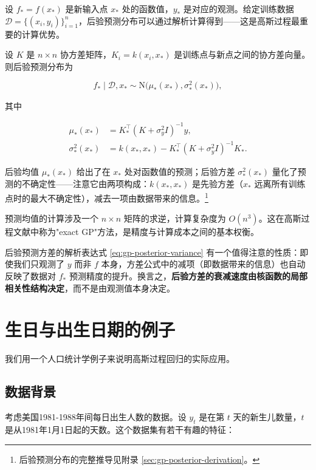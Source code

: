 设 $f_* = f(x_*)$ 是新输入点 $x_*$ 处的函数值，$y_*$ 是对应的观测。给定训练数据 $\mathcal{D} = \{(x_i, y_i)\}_{i=1}^n$，后验预测分布可以通过解析计算得到——这是高斯过程最重要的计算优势。

设 $K$ 是 $n \times n$ 协方差矩阵，$K_i = k(x_i, x_*)$ 是训练点与新点之间的协方差向量。则后验预测分布为

\begin{equation}
f_* \mid \mathcal{D}, x_* \sim \mathrm{N}\bigl(\mu_*(x_*), \sigma_*^2(x_*)\bigr), \label{eq:gp-posterior-predictive}
\end{equation}

其中

\begin{align}
\mu_*(x_*) &= K_*^\top (K + \sigma_y^2 I)^{-1} y, \label{eq:gp-posterior-mean} \\
\sigma_*^2(x_*) &= k(x_*, x_*) - K_*^\top (K + \sigma_y^2 I)^{-1} K_*. \label{eq:gp-posterior-variance}
\end{align}

后验均值 $\mu_*(x_*)$ 给出了在 $x_*$ 处对函数值的预测；后验方差 $\sigma_*^2(x_*)$ 量化了预测的不确定性——注意它由两项构成：$k(x_*, x_*)$ 是先验方差（$x_*$ 远离所有训练点时的最大不确定性），减去一项由数据带来的信息。\footnote{后验预测分布的完整推导见附录 \cref{sec:gp-posterior-derivation}。}

预测均值的计算涉及一个 $n \times n$ 矩阵的求逆，计算复杂度为 $O(n^3)$。这在高斯过程文献中称为"exact GP"方法，是精度与计算成本之间的基本权衡。

\begin{Remark}
  后验预测方差的解析表达式 \eqref{eq:gp-posterior-variance} 有一个值得注意的性质：即使我们只观测了 $y$ 而非 $f$ 本身，方差公式中的减项（即数据带来的信息）也自动反映了数据对 $f_*$ 预测精度的提升。换言之，\textbf{后验方差的衰减速度由核函数的局部相关性结构决定}，而不是由观测值本身决定。
\end{Remark}

\section{生日与出生日期的例子}\label{sec:gp-birthday-example}

我们用一个人口统计学例子来说明高斯过程回归的实际应用。

\subsection{数据背景}

考虑美国1981-1988年间每日出生人数的数据。设 $y_t$ 是在第 $t$ 天的新生儿数量，$t$ 是从1981年1月1日起的天数。这个数据集有若干有趣的特征：

